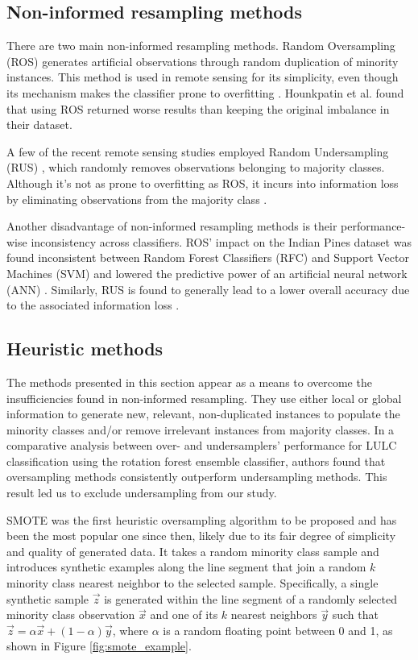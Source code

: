 \documentclass[parskip=full]{scrartcl}
\begin{document}
\subsection{Non-informed resampling methods}

There are two main non-informed resampling methods. Random Oversampling (ROS)
generates artificial observations through random duplication of minority
instances.  This method is used in remote sensing \cite{Sharififar2019,
Hounkpatin2018} for its simplicity, even though its mechanism makes the
classifier prone to overfitting \cite{Krawczyk2016}. Hounkpatin et al.
\cite{Hounkpatin2018} found that using ROS returned worse results than keeping
the original imbalance in their dataset.

A few of the recent remote sensing studies employed Random Undersampling (RUS)
\cite{Ferreira2019}, which randomly removes
observations belonging to majority classes. Although it's not as prone to
overfitting as ROS, it incurs into information loss by eliminating observations
from the majority class \cite{Feng2019}.

Another disadvantage of non-informed resampling methods is their performance-wise
inconsistency across classifiers. ROS' impact on the Indian Pines dataset was
found inconsistent between Random Forest Classifiers (RFC) and Support Vector
Machines (SVM) and lowered the predictive power of an artificial neural network
(ANN) \cite{Maxwell2018}. Similarly, RUS is found to generally lead to a lower
overall accuracy due to the associated information loss \cite{Maxwell2018}.

\subsection{Heuristic methods}

The methods presented in this section appear as a means to overcome the
insufficiencies found in non-informed resampling. They use either local or
global information to generate new, relevant, non-duplicated instances to
populate the minority classes and/or remove irrelevant instances from majority
classes. In a comparative analysis between over- and undersamplers' performance
for LULC classification \cite{Feng2018} using the rotation forest ensemble
classifier, authors found that oversampling methods consistently outperform
undersampling methods. This result led us to exclude undersampling from our
study.

SMOTE \cite{Chawla2002} was the first heuristic oversampling algorithm to be
proposed and has been the most popular one since then, likely due to its fair
degree of simplicity and quality of generated data. It takes a random minority
class sample and introduces synthetic examples along the line segment that join
a random $k$ minority class nearest neighbor to the selected sample.
Specifically, a single synthetic sample $\overrightarrow{z}$ is generated within
the line segment of a randomly selected minority class observation
$\overrightarrow{x}$ and one of its $k$ nearest neighbors $\overrightarrow{y}$
such that $\overrightarrow{z} =
\alpha\overrightarrow{x}+(1-\alpha)\overrightarrow{y}$, where $\alpha$ is a
random floating point between 0 and 1, as shown in Figure
\ref{fig:smote_example}.
\end{document}
